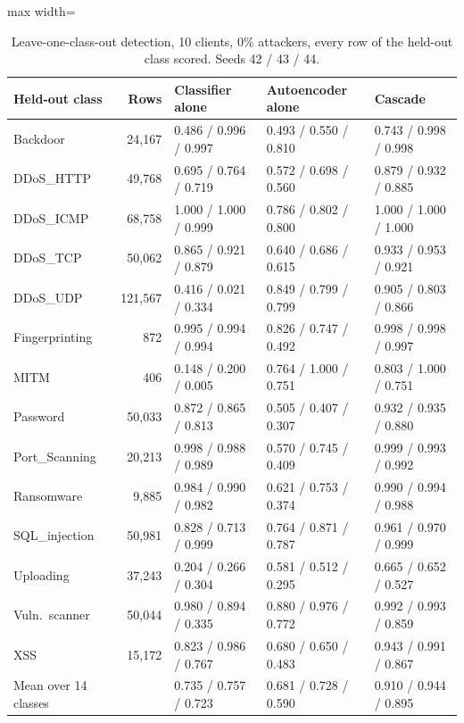 \begin{table}[t]
\centering
\caption{Leave-one-class-out detection, 10 clients, 0\% attackers, every row of the held-out class scored. Seeds 42 / 43 / 44.}
\label{tab:zeroday}
\small
\begin{adjustbox}{max width=\linewidth}
\begin{tabular}{lrlll}
\toprule
Held-out class & Rows & Classifier alone & Autoencoder alone & Cascade \\
\midrule
Backdoor & 24,167 & 0.486 / 0.996 / 0.997 & 0.493 / 0.550 / 0.810 & 0.743 / 0.998 / 0.998 \\
DDoS\_HTTP & 49,768 & 0.695 / 0.764 / 0.719 & 0.572 / 0.698 / 0.560 & 0.879 / 0.932 / 0.885 \\
DDoS\_ICMP & 68,758 & 1.000 / 1.000 / 0.999 & 0.786 / 0.802 / 0.800 & 1.000 / 1.000 / 1.000 \\
DDoS\_TCP & 50,062 & 0.865 / 0.921 / 0.879 & 0.640 / 0.686 / 0.615 & 0.933 / 0.953 / 0.921 \\
DDoS\_UDP & 121,567 & 0.416 / 0.021 / 0.334 & 0.849 / 0.799 / 0.799 & 0.905 / 0.803 / 0.866 \\
Fingerprinting & 872 & 0.995 / 0.994 / 0.994 & 0.826 / 0.747 / 0.492 & 0.998 / 0.998 / 0.997 \\
MITM & 406 & 0.148 / 0.200 / 0.005 & 0.764 / 1.000 / 0.751 & 0.803 / 1.000 / 0.751 \\
Password & 50,033 & 0.872 / 0.865 / 0.813 & 0.505 / 0.407 / 0.307 & 0.932 / 0.935 / 0.880 \\
Port\_Scanning & 20,213 & 0.998 / 0.988 / 0.989 & 0.570 / 0.745 / 0.409 & 0.999 / 0.993 / 0.992 \\
Ransomware & 9,885 & 0.984 / 0.990 / 0.982 & 0.621 / 0.753 / 0.374 & 0.990 / 0.994 / 0.988 \\
SQL\_injection & 50,981 & 0.828 / 0.713 / 0.999 & 0.764 / 0.871 / 0.787 & 0.961 / 0.970 / 0.999 \\
Uploading & 37,243 & 0.204 / 0.266 / 0.304 & 0.581 / 0.512 / 0.295 & 0.665 / 0.652 / 0.527 \\
Vuln.\ scanner & 50,044 & 0.980 / 0.894 / 0.335 & 0.880 / 0.976 / 0.772 & 0.992 / 0.993 / 0.859 \\
XSS & 15,172 & 0.823 / 0.986 / 0.767 & 0.680 / 0.650 / 0.483 & 0.943 / 0.991 / 0.867 \\
\midrule
Mean over 14 classes & & 0.735 / 0.757 / 0.723 & 0.681 / 0.728 / 0.590 & 0.910 / 0.944 / 0.895 \\
\bottomrule
\end{tabular}
\end{adjustbox}
\end{table}
